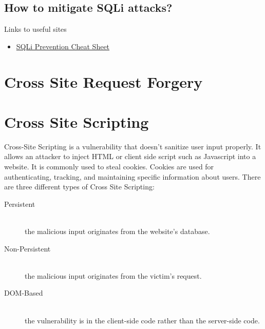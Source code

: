 \documentclass[a4paper, titlepage]{article}
\begin{document}
\subsection{How to mitigate SQLi attacks?}
Links to useful sites
\begin{itemize}
    \item \href{https://www.owasp.org/index.php/SQL_Injection_Prevention_Cheat_Sheet}{SQLi Prevention Cheat Sheet}
\end{itemize}
\newpage


\section{Cross Site Request Forgery}
\newpage


\section{Cross Site Scripting}

Cross-Site Scripting is a vulnerability that doesn't sanitize user input properly. It allows an attacker to inject HTML or client side script such as Javascript into a website. It is commonly used to steal cookies. Cookies are used for authenticating, tracking, and maintaining specific information about users. There are three different types of Cross Site Scripting:
\begin{description}
    \item [Persistent] \hfill \\
        the malicious input originates from the website's database.
    \item [Non-Persistent]\hfill \\
        the malicious input originates from the victim's request.
    \item [DOM-Based]\hfill \\
        the vulnerability is in the client-side code rather than the server-side code.
\end{description}
\end{document}

